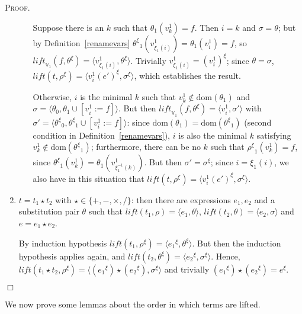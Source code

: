 \documentclass{article}
\newenvironment{proof}{\smallskip\textsc{Proof.}}{\hspace*{\fill}$\Box$}
\newcommand{\V}{{\mathbb V}}
\newcommand{\liftv}[1]{\ensuremath{\mathit{lift}_{\V_{#1}}}}
\newcommand{\lift}{\ensuremath{\mathit{lift}}}
\newcommand{\dom}{\ensuremath{\mathrm{dom}}}
\newcommand{\renamevar}[2]{\ensuremath{{#1}^{#2}}}
\newcommand{\isrenamevar}[3]{\ensuremath{{#1}=\renamevar{#2}{#3}}}
\begin{document}
\begin{proof}
\begin{enumerate}
\begin{enumerate}
Suppose there is an $k$ such that $\theta_1(v^1_k)=f$.  Then $i=k$ and
$\sigma=\theta$; but by Definition~\ref{renamevars}
$\renamevar\theta\xi_1\left(v^1_{\xi_1(i)}\right)=\theta_1(v^1_i)=f$, so
$\liftv1(f,\renamevar\theta\xi)=\langle v^1_{\xi_1(i)},\renamevar\theta\xi\rangle$.
Trivially {\isrenamevar{v^1_{\xi_1(i)}}{(v^1_i)}\xi}; since $\theta=\sigma$,
$\lift(t,{\renamevar\rho\xi})=\langle\renamevar{v^1_i(e')}\xi,\renamevar\sigma\xi\rangle$,
which establishes the result.

Otherwise, $i$ is the minimal $k$ such that $v^1_k\not\in\dom(\theta_1)$
and $\sigma=\langle\theta_0,\theta_1\cup[v^1_i:=f]\rangle$.
But then $\liftv1(f,\renamevar\theta\xi)=\langle v^1_i,\sigma'\rangle$ with
$\sigma'=\langle\renamevar\theta\xi_0,\renamevar\theta\xi_1\cup[v^1_i:=f]\rangle$:
since $\dom(\theta_1)=\dom(\renamevar\theta\xi_1)$ (second condition in
Definition~\ref{renamevars}), $i$ is also the minimal $k$
satisfying $v^1_k\not\in\dom(\renamevar\theta\xi_1)$; furthermore, there can be no
$k$ such that $\renamevar\rho\xi_1(v^1_k)=f$, since
$\renamevar\theta\xi_1(v^1_k)=\theta_1(v^1_{\xi^{-1}_1(k)})$.
But then {\isrenamevar{\sigma'}\sigma\xi}; since $i=\xi_1(i)$,
we also have in this situation that
$\lift(t,{\renamevar\rho\xi})=\langle\renamevar{v^1_i(e')}\xi,\renamevar\sigma\xi\rangle$.
\end{enumerate}
\item $t=t_1\star t_2$ with $\star\in\{+,-,\times,/\}$: then there are
expressions $e_1,e_2$ and a substitution pair $\theta$ such that
$\lift(t_1,\rho)=\langle e_1,\theta\rangle$,
$\lift(t_2,\theta)=\langle e_2,\sigma\rangle$ and $e=e_1\star e_2$.

By induction hypothesis $\lift(t_1,{\renamevar\rho\xi})=%
\langle\renamevar{e_1}\xi,\renamevar\theta\xi\rangle$.
But then the induction hypothesis applies again, and
$\lift(t_2,\renamevar\theta\xi)=\langle\renamevar{e_2}\xi,%
\renamevar\sigma\xi\rangle$.  Hence, $\lift(t_1\star t_2,{\renamevar\rho\xi})=%
\langle(\renamevar{e_1}\xi)\star(\renamevar{e_2}\xi),%
\renamevar\sigma\xi\rangle$ and trivially
$(\renamevar{e_1}\xi)\star(\renamevar{e_2}\xi)=\renamevar e\xi$.
\end{enumerate}
\end{proof}

We now prove some lemmas about the order in which terms are lifted.
\end{document}
